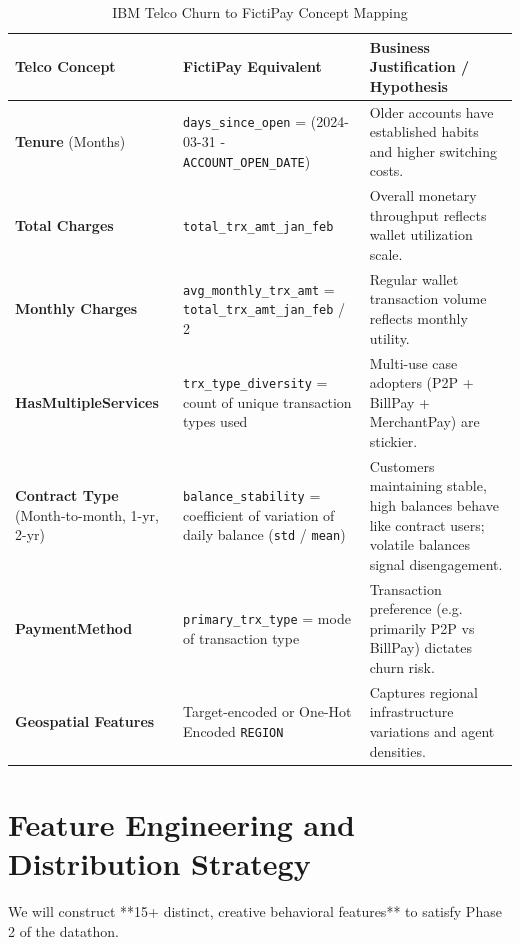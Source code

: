 \documentclass[11pt,a4paper]{article}
\begin{document}
\begin{table}[htbp]
\centering
\caption{IBM Telco Churn to FictiPay Concept Mapping}
\begin{tabular}{p{4cm}p{5cm}p{6cm}}
\toprule
\textbf{Telco Concept} & \textbf{FictiPay Equivalent} & \textbf{Business Justification / Hypothesis} \\
\midrule
\textbf{Tenure} (Months) & \texttt{days\_since\_open} = (2024-03-31 - \texttt{ACCOUNT\_OPEN\_DATE}) & Older accounts have established habits and higher switching costs. \\
\midrule
\textbf{Total Charges} & \texttt{total\_trx\_amt\_jan\_feb} & Overall monetary throughput reflects wallet utilization scale. \\
\midrule
\textbf{Monthly Charges} & \texttt{avg\_monthly\_trx\_amt} = \texttt{total\_trx\_amt\_jan\_feb} / 2 & Regular wallet transaction volume reflects monthly utility. \\
\midrule
\textbf{HasMultipleServices} & \texttt{trx\_type\_diversity} = count of unique transaction types used & Multi-use case adopters (P2P + BillPay + MerchantPay) are stickier. \\
\midrule
\textbf{Contract Type} (Month-to-month, 1-yr, 2-yr) & \texttt{balance\_stability} = coefficient of variation of daily balance (\texttt{std} / \texttt{mean}) & Customers maintaining stable, high balances behave like contract users; volatile balances signal disengagement. \\
\midrule
\textbf{PaymentMethod} & \texttt{primary\_trx\_type} = mode of transaction type & Transaction preference (e.g. primarily P2P vs BillPay) dictates churn risk. \\
\midrule
\textbf{Geospatial Features} & Target-encoded or One-Hot Encoded \texttt{REGION} & Captures regional infrastructure variations and agent densities. \\
\bottomrule
\end{tabular}
\end{table}

\section{Feature Engineering and Distribution Strategy}
We will construct **15+ distinct, creative behavioral features** to satisfy Phase 2 of the datathon.
\end{document}
